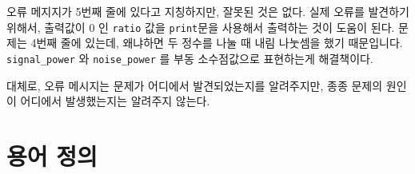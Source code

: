오류 메지지가 5번째 줄에 있다고 지칭하지만, 잘못된 것은 없다. 
실제 오류를 발견하기 위해서, 
출력값이 0 인 {\tt ratio} 값을 {\tt print}문을 사용해서 출력하는 것이 도움이 된다.
문제는 4번째 줄에 있는데, 왜냐하면 두 정수를 나눌 때 내림 나눗셈을 했기 때문입니다. 
\verb"signal_power" 와 \verb"noise_power" 를 부동 소수점값으로 표현하는게 해결책이다.


대체로, 오류 메시지는 문제가 어디에서 발견되었는지를 알려주지만, 
종종 문제의 원인이 어디에서 발생했는지는 알려주지 않는다.

\section{용어 정의}

